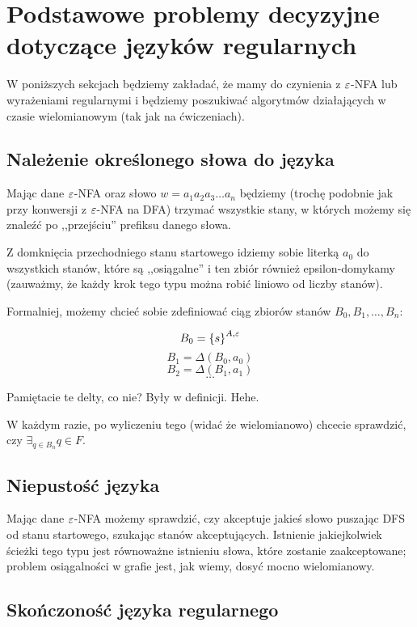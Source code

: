\section{Podstawowe problemy decyzyjne dotyczące języków regularnych}

W poniższych sekcjach będziemy zakładać, że mamy do czynienia z \( \varepsilon\)-NFA lub wyrażeniami regularnymi i będziemy poszukiwać algorytmów działających w czasie wielomianowym (tak jak na ćwiczeniach). 

\subsection{Należenie określonego słowa do języka}

Mając dane \(\varepsilon\)-NFA oraz słowo \(w = a_1a_2a_3\dots a_n\) będziemy (trochę podobnie jak przy konwersji z \(\varepsilon\)-NFA na DFA) trzymać wszystkie stany, w których możemy się znaleźć po ,,przejściu'' prefiksu danego słowa.

Z domknięcia przechodniego stanu startowego idziemy sobie literką \(a_0\) do wszystkich stanów, które są ,,osiągalne'' i ten zbiór również epsilon-domykamy (zauważmy, że każdy krok tego typu można robić liniowo od liczby stanów). 

Formalniej, możemy chcieć sobie zdefiniować ciąg zbiorów stanów \(B_{0}, B_{1}, \dots, B_{n} \):

\[ 
B_{0} = \set{s}^{A, \eps}
\]
\[
B_1 = \Delta(B_0, a_0) 
\]
\[
B_2 = \Delta(B_1, a_1)
\]
\[ 
\dots 
\]

Pamiętacie te delty, co nie? Były w definicji. Hehe. 

W każdym razie, po wyliczeniu tego (widać że wielomianowo) chcecie sprawdzić, czy \( \exists_{q \in B_n} q \in F \).

\subsection{Niepustość języka}

Mając dane \(\varepsilon\)-NFA możemy sprawdzić, czy akceptuje jakieś słowo puszając DFS od stanu startowego, szukając stanów akceptujących. Istnienie jakiejkolwiek ścieżki tego typu jest równoważne istnieniu słowa, które zostanie zaakceptowane; problem osiągalności w grafie jest, jak wiemy, dosyć mocno wielomianowy. 

\subsection{Skończoność języka regularnego}

